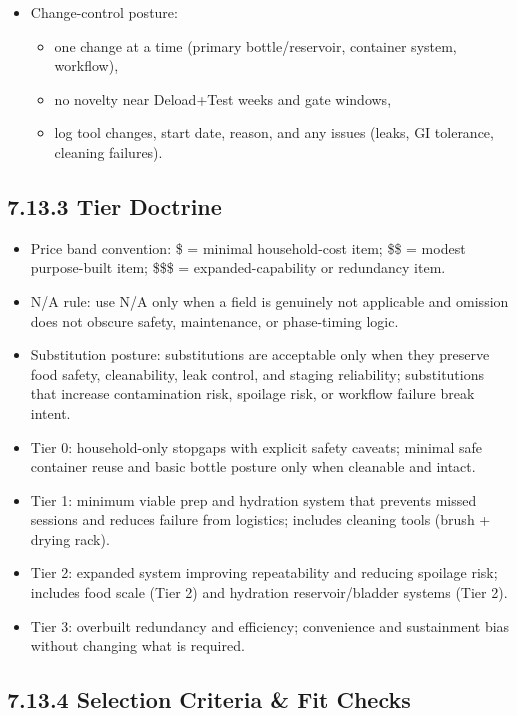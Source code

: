 \documentclass[10pt]{article}
\begin{document}
\begin{itemize}
\item Change-control posture:
  \begin{itemize}
  \item one change at a time (primary bottle/reservoir, container system, workflow),
  \item no novelty near Deload+Test weeks and gate windows,
  \item log tool changes, start date, reason, and any issues (leaks, GI tolerance, cleaning failures).
  \end{itemize}
\end{itemize}

\subsection*{7.13.3 Tier Doctrine}
{}

\begin{itemize}
\item Price band convention: \$ = minimal household-cost item; \$\$ = modest purpose-built item; \$\$\$ = expanded-capability or redundancy item.
\item N/A rule: use N/A only when a field is genuinely not applicable and omission does not obscure safety, maintenance, or phase-timing logic.
\item Substitution posture: substitutions are acceptable only when they preserve food safety, cleanability, leak control, and staging reliability; substitutions that increase contamination risk, spoilage risk, or workflow failure break intent.
\item Tier 0: household-only stopgaps with explicit safety caveats; minimal safe container reuse and basic bottle posture only when cleanable and intact.
\item Tier 1: minimum viable prep and hydration system that prevents missed sessions and reduces failure from logistics; includes cleaning tools (brush + drying rack).
\item Tier 2: expanded system improving repeatability and reducing spoilage risk; includes food scale (Tier 2) and hydration reservoir/bladder systems (Tier 2).
\item Tier 3: overbuilt redundancy and efficiency; convenience and sustainment bias without changing what is required.
\end{itemize}

\subsection*{7.13.4 Selection Criteria \& Fit Checks}
{}
\end{document}
